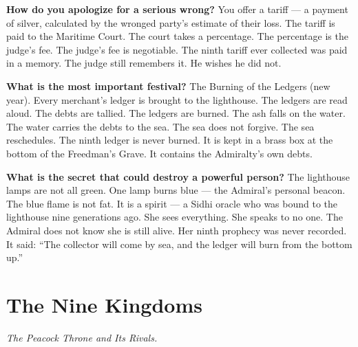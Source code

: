 \begin{almanac}
\textbf{How do you apologize for a serious wrong?} You offer a tariff --- a payment of silver, calculated by the wronged party's estimate of their loss. The tariff is paid to the Maritime Court. The court takes a percentage. The percentage is the judge's fee. The judge's fee is negotiable. The ninth tariff ever collected was paid in a memory. The judge still remembers it. He wishes he did not.

\textbf{What is the most important festival?} The Burning of the Ledgers (new year). Every merchant's ledger is brought to the lighthouse. The ledgers are read aloud. The debts are tallied. The ledgers are burned. The ash falls on the water. The water carries the debts to the sea. The sea does not forgive. The sea reschedules. The ninth ledger is never burned. It is kept in a brass box at the bottom of the Freedman's Grave. It contains the Admiralty's own debts.

\textbf{What is the secret that could destroy a powerful person?} The lighthouse lamps are not all green. One lamp burns blue --- the Admiral's personal beacon. The blue flame is not fat. It is a spirit --- a Sidhi oracle who was bound to the lighthouse nine generations ago. She sees everything. She speaks to no one. The Admiral does not know she is still alive. Her ninth prophecy was never recorded. It said: ``The collector will come by sea, and the ledger will burn from the bottom up.''
\end{almanac}

\newpage

\newpage

\chapter{The Nine Kingdoms}
\emph{The Peacock Throne and Its Rivals.}

